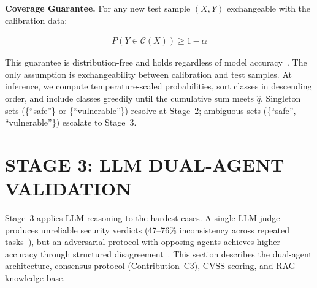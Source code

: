 \textbf{Coverage Guarantee.} For any new test sample $(X, Y)$ exchangeable with the calibration data:

\begin{align}
P(Y \in \mathcal{C}(X)) \geq 1 - \alpha
\label{eq:coverage}
\end{align}

This guarantee is distribution-free and holds regardless of model accuracy~\cite{barber2023}. The only assumption is exchangeability between calibration and test samples. At inference, we compute temperature-scaled probabilities, sort classes in descending order, and include classes greedily until the cumulative sum meets $\hat{q}$. Singleton sets (\{``safe''\} or \{``vulnerable''\}) resolve at Stage~2; ambiguous sets (\{``safe'', ``vulnerable''\}) escalate to Stage~3.

\section{\uppercase{Stage 3: LLM Dual-Agent Validation}}
\label{sec:llm}

Stage~3 applies LLM reasoning to the hardest cases. A single LLM judge produces unreliable security verdicts (47--76\% inconsistency across repeated tasks~\cite{steenhoek2024}), but an adversarial protocol with opposing agents achieves higher accuracy through structured disagreement~\cite{multiagentdebate2023}. This section describes the dual-agent architecture, consensus protocol (Contribution~C3), CVSS scoring, and RAG knowledge base.

